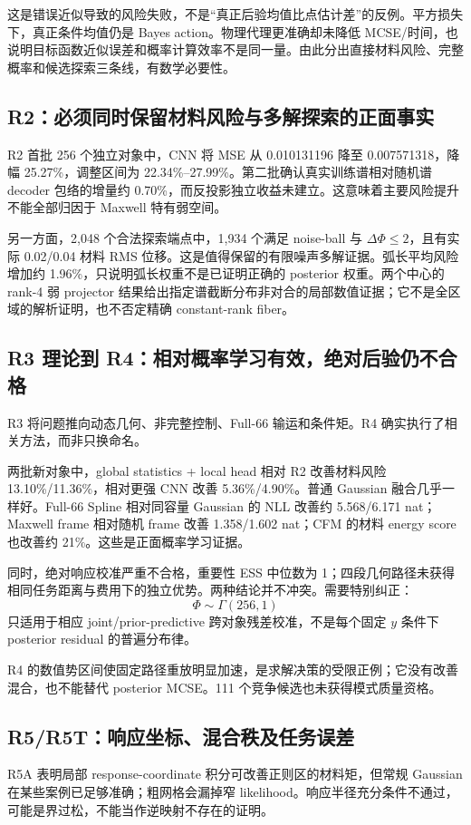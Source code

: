 这是错误近似导致的风险失败，不是“真正后验均值比点估计差”的反例。平方损失下，真正条件均值仍是 Bayes action。物理代理更准确却未降低 MCSE/时间，也说明目标函数近似误差和概率计算效率不是同一量。由此分出直接材料风险、完整概率和候选探索三条线，有数学必要性。

\subsection{R2：必须同时保留材料风险与多解探索的正面事实}
R2 首批 256 个独立对象中，CNN 将 MSE 从 0.010131196 降至 0.007571318，降幅 25.27\%，调整区间为 22.34\%--27.99\%。第二批确认真实训练谱相对随机谱 decoder 包络的增量约 0.70\%，而反投影独立收益未建立。这意味着主要风险提升不能全部归因于 Maxwell 特有弱空间。

另一方面，2,048 个合法探索端点中，1,934 个满足 noise-ball 与 $\Delta\Phi\le2$，且有实际 0.02/0.04 材料 RMS 位移。这是值得保留的有限噪声多解证据。弧长平均风险增加约 1.96\%，只说明弧长权重不是已证明正确的 posterior 权重。两个中心的 rank-4 弱 projector 结果给出指定谱截断分布非对合的局部数值证据；它不是全区域的解析证明，也不否定精确 constant-rank fiber。

\subsection{R3 理论到 R4：相对概率学习有效，绝对后验仍不合格}
R3 将问题推向动态几何、非完整控制、Full-66 输运和条件矩。R4 确实执行了相关方法，而非只换命名。

两批新对象中，global statistics + local head 相对 R2 改善材料风险 13.10\%/11.36\%，相对更强 CNN 改善 5.36\%/4.90\%。普通 Gaussian 融合几乎一样好。Full-66 Spline 相对同容量 Gaussian 的 NLL 改善约 5.568/6.171 nat；Maxwell frame 相对随机 frame 改善 1.358/1.602 nat；CFM 的材料 energy score 也改善约 21\%。这些是正面概率学习证据。

同时，绝对响应校准严重不合格，重要性 ESS 中位数为 1；四段几何路径未获得相同任务距离与费用下的独立优势。两种结论并不冲突。需要特别纠正：
\[
\Phi\sim\Gamma(256,1)
\]
只适用于相应 joint/prior-predictive 跨对象残差校准，不是每个固定 $y$ 条件下 posterior residual 的普遍分布律。

R4 的数值势区间使固定路径重放明显加速，是求解决策的受限正例；它没有改善混合，也不能替代 posterior MCSE。111 个竞争候选也未获得模式质量资格。

\subsection{R5/R5T：响应坐标、混合秩及任务误差}
R5A 表明局部 response-coordinate 积分可改善正则区的材料矩，但常规 Gaussian 在某些案例已足够准确；粗网格会漏掉窄 likelihood。响应半径充分条件不通过，可能是界过松，不能当作逆映射不存在的证明。

